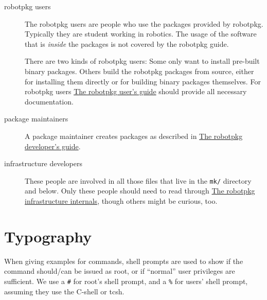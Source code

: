 \begin{description}
   \item[robotpkg users] The  robotpkg users  are people  who  use the packages
   provided by robotpkg.  Typically they are student  working  in robotics. The
   usage  of the software  that is {\em inside} the  packages is not covered by
   the robotpkg guide.

   There are two kinds of  robotpkg users: Some  only want to install pre-built
   binary packages.  Others build the robotpkg packages from source, either for
   installing them  directly or for building  binary  packages themselves.  For
   robotpkg users   \hyperref[chapter:user]{The    robotpkg user's guide}   should
   provide all necessary documentation.

   \item[package  maintainers]   A   package maintainer  creates  packages   as
   described in \hyperref[chapter:developer]{The robotpkg developer's guide}.

   \item[infrastructure   developers] These people   are  involved in all those
   files that  live in the  {\tt mk/}  directory  and below. Only  these people
   should need    to   read  through     \hyperref[chapter:internal]{The  robotpkg
   infrastructure internals}, though others might be curious, too.

\end{description}


\section{Typography} %

When giving examples for  commands,  shell prompts  are  used  to show if   the
command  should/can be issued  as  root, or if  ``normal''  user privileges are
sufficient. We use  a {\tt \#}  for  root's shell  prompt, and  a {\tt \%}  for
users' shell prompt, assuming they use the C-shell or tcsh.
